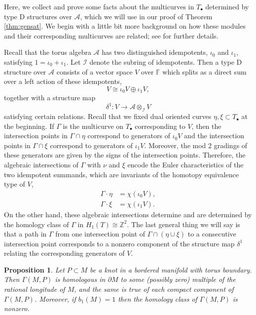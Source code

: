 \documentclass[11pt]{amsart}
\newtheorem {proposition}[theorem]{Proposition}
\numberwithin{equation}{section}
\numberwithin{theorem}{section}
\theoremstyle{definition}
\newcommand{\Z}{\mathbb{Z}}
\newcommand{\F}{\mathbb{F}}
\newcommand{\Alg}{\mathcal{A}}
\begin{document}
Here, we collect and prove some facts about the multicurves in $T_\bullet$ determined by type D structures over $\Alg$, which we will use in our proof of Theorem \ref{thm:gensat}. We begin with a little bit more background on how these modules and their corresponding multicurves are related; see \cite[\S2]{hrw} for further details.

Recall that the torus algebra $\Alg$ has two distinguished idempotents, $\iota_0$ and $\iota_1$, satisfying $1 = \iota_0+\iota_1$. Let $\mathcal{I}$ denote the subring of idempotents. Then a type D structure over $\Alg$ consists of a vector space $V$ over $\F$ which splits as a direct sum over a left action of these idempotents, \[V\cong \iota_0V \oplus \iota_1 V,\] together with a structure map \[\delta^1:V\to \Alg\otimes_\mathcal{I} V\] satisfying certain relations. Recall that we fixed dual oriented curves $\eta,\xi\subset T_\bullet$ at the beginning. If $\Gamma$ is the multicurve on $T_\bullet$ corresponding to $V$, then the intersection points in $\Gamma\cap \eta$ correspond to generators of $\iota_0V$ and the intersection points in $\Gamma\cap \xi$ correspond to generators of $\iota_1V$. Moreover, the mod 2 gradings of these generators are given by the signs of the intersection points. Therefore, the algebraic intersections of $\Gamma$ with $\nu$ and $\xi$ encode the Euler characteristics of the two idempotent summands, which are invariants of the homotopy equivalence type of $V$,
\begin{align*}
\Gamma \cdot \eta &= \chi(\iota_0V),\\
\Gamma \cdot \xi &= \chi(\iota_1V).
\end{align*}
On the other hand, these algebraic intersections determine and are determined by the homology class of $\Gamma$ in $H_1(T)\cong \Z^2$. The last general thing we will say is that a path in $\Gamma$ from one intersection point of $\Gamma \cap(\eta\cup \xi)$ to a consecutive intersection point corresponds to a nonzero component of the structure map $\delta^1$ relating the  corresponding generators of $V$.


\begin{proposition}\label{prop:curve-homology-class}
Let  $P\subset M$ be a knot in a bordered manifold  with torus boundary. Then $\Gamma(M, P)$ is homologous in $\partial M$ to some (possibly zero) multiple of the rational longitude of $M$, and the same is true of each compact component of $\Gamma(M, P)$. Moreover, if $b_1(M) = 1$ then the homology class of $\Gamma(M,P)$ is nonzero.
\end{proposition}
\end{document}
